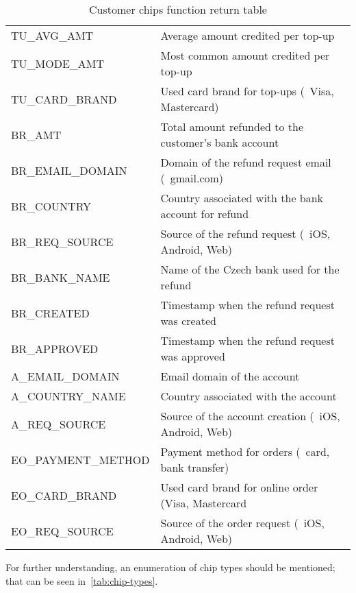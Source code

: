 \begin{table}[h]
\begin{tabularx}{\textwidth}{|>{\columncolor{unicorn_blue!5}}X|>{\columncolor{unicorn_blue!5}}l|}
		TU\_AVG\_AMT & Average amount credited per top-up \\
		TU\_MODE\_AMT & Most common amount credited per top-up \\
		TU\_CARD\_BRAND & Used card brand for top-ups (\eg~Visa, Mastercard) \\
		\hline
		BR\_AMT & Total amount refunded to the customer's bank account \\
		BR\_EMAIL\_DOMAIN & Domain of the refund request email (\eg~gmail.com) \\
		BR\_COUNTRY & Country associated with the bank account for refund \\
		BR\_REQ\_SOURCE & Source of the refund request (\eg~iOS, Android, Web) \\
		BR\_BANK\_NAME & Name of the Czech bank used for the refund \\
		BR\_CREATED & Timestamp when the refund request was created \\
		BR\_APPROVED & Timestamp when the refund request was approved \\
		\hline
		A\_EMAIL\_DOMAIN & Email domain of the account \\
		A\_COUNTRY\_NAME & Country associated with the account \\
		A\_REQ\_SOURCE & Source of the account creation (\eg~iOS, Android, Web) \\
		EO\_PAYMENT\_METHOD & Payment method for orders (\eg~card, bank transfer) \\
		EO\_CARD\_BRAND & Used card brand for online order (Visa, Mastercard \\
		EO\_REQ\_SOURCE & Source of the order request (\eg~iOS, Android, Web) \\
		\hline
	\end{tabularx}
	\caption{Customer chips function return table}
	\label{tab:chip-customers-columns}
	\source
\end{table}

For further understanding, an enumeration of chip types should be mentioned; that can be seen in~\autoref{tab:chip-types}.

